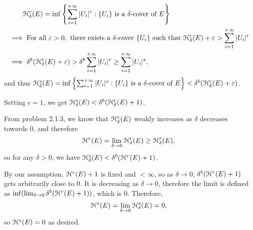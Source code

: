 \begin{enumerate}
    \begin{align*}
        &\phantom{\implies} \mathcal{H}_\delta^r(E) = \inf \left\{\sum_{i = 1}^{+\infty} |U_i|^r : \{U_i\} \text{ is a } \delta \text{-cover of } E\right\}\\
        &\implies \text{For all }\varepsilon > 0, \text{ there exists a }\delta\text{-cover }\{U_i\} \text{ such that } \mathcal{H}_{\delta}^r(E) + \varepsilon > \sum_{i = 1}^{+\infty} |U_i|^r\\
        &\implies \delta^b (\mathcal{H}_\delta^r(E) + \varepsilon) > \delta^b \sum_{i = 1}^{+\infty} |U_i|^r \geq \sum_{i = 1}^{+\infty} |U_i|^s,
    \end{align*}
    and thus \(\mathcal{H}_\delta^s(E) = \inf \left\{\sum_{i = 1}^{+\infty} |U_i|^s : \{U_i\} \text{ is a } \delta \text{-cover of } E\right\} < \delta^b (\mathcal{H}_\delta^r(E) + \varepsilon)\).

    Setting \(\epsilon = 1\), we get \(\mathcal{H}_\delta^s(E) < \delta^b (\mathcal{H}_\delta^r(E) + 1)\).

    From problem 2.1.3, we know that \(\mathcal{H}_\delta^r(E)\) weakly increases as \(\delta\) decreases towards 0, and therefore
    \[
    \mathcal{H}^r(E) = \lim_{\delta \to 0} \mathcal{H}_\delta^r(E) \geq \mathcal{H}_\delta^r(E),
    \]
    so for any \(\delta > 0\), we have \(\mathcal{H}_\delta^s(E) < \delta^b (\mathcal{H}^r(E) + 1)\).

    By our assumption, \(\mathcal{H}^r(E) + 1\) is fixed and \(< \infty\), so as \(\delta \to 0\), \(\delta^b(\mathcal{H}^r(E) + 1)\) gets arbitrarily close to 0. It is decreasing as  \(\delta \to 0\), therefore the limit is defined as  \(\inf( \lim_{\delta \to 0} \delta^b(\mathcal{H}^r(E) + 1))\), which is 0. Therefore,
    \[
    \mathcal{H}^s(E) = \lim_{\delta \to 0} \mathcal{H}_{\delta}^s (E) = 0,
    \]
   so \(\mathcal{H}^s(E) = 0\) as desired.
\end{enumerate}